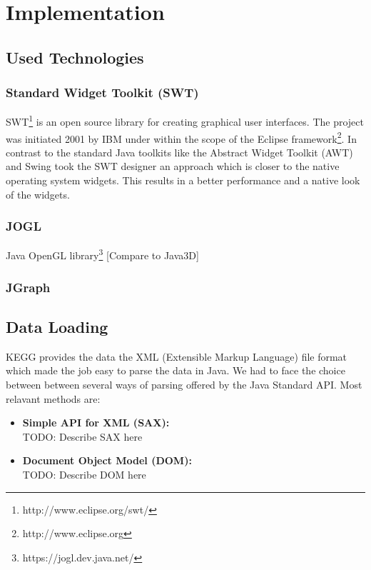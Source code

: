 \chapter{Implementation}

\section{Used Technologies}
\subsection{Standard Widget Toolkit (SWT)}

SWT\footnote{http://www.eclipse.org/swt/} is an open source library for creating graphical user interfaces. The project was initiated 2001 by IBM under within the scope of the Eclipse framework\footnote{http://www.eclipse.org}. In contrast to the standard Java toolkits like the Abstract Widget Toolkit (AWT) and Swing took the SWT designer an approach which is closer to the native operating system widgets. This results in a better performance and a native look of the widgets.

\subsection{JOGL}

Java OpenGL library\footnote{https://jogl.dev.java.net/}
[Compare to Java3D]

\subsection{JGraph}

\section{Data Loading}

KEGG provides the data the XML (Extensible Markup Language) file format which made the job easy to parse the data in Java. We had to face the choice between between several ways of parsing offered by the Java Standard API. 
Most relavant methods are\citep{Niemeyer2002}:
\begin{itemize}
 \item \textbf{Simple API for XML (SAX):}\\
  TODO: Describe SAX here
 \item \textbf{Document Object Model (DOM):}\\
  TODO: Describe DOM here
\end{itemize}

